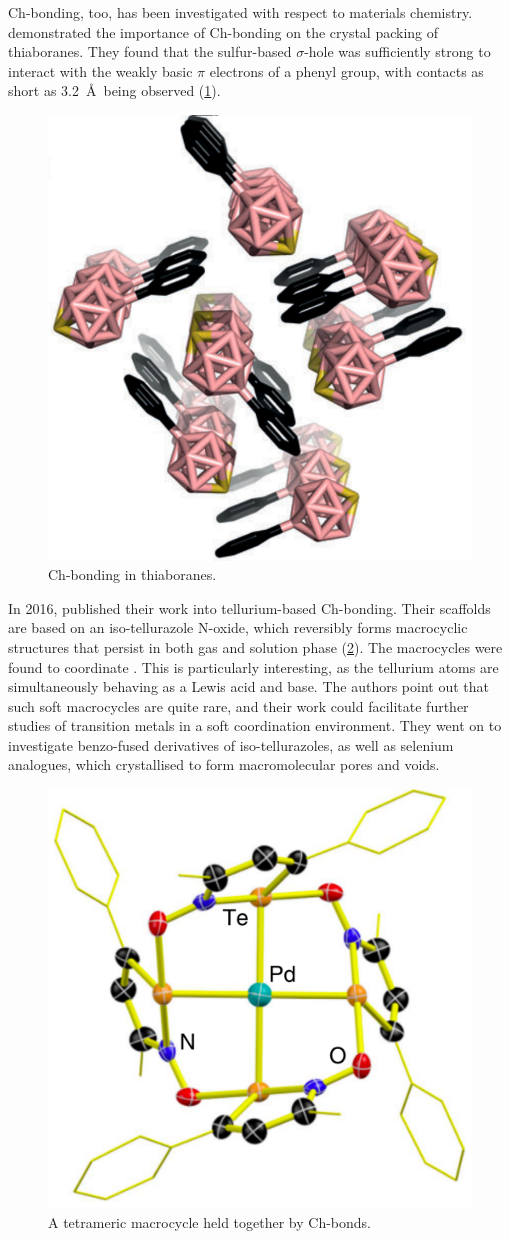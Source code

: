 \begin{refsection}
Ch-bonding, too, has been investigated with respect to materials chemistry.
\citeauthor{Fanfrlik2014} demonstrated the importance of Ch-bonding on the crystal packing of thiaboranes.\autocite{Fanfrlik2014}
They found that the sulfur-based $ \sigma $-hole was sufficiently strong to interact with the weakly basic $ \pi $ electrons of a phenyl group, with contacts as short as 3.2~\AA\ being observed (\cref{fig:thiaborane-ch-bond}).

\begin{figure}
    \centering
    \includegraphics[width=0.45\linewidth]{Figures/thiaborane-ch-bond.pdf}
    \caption[Ch-bonding in thiaboranes.]{Ch-bonding in thiaboranes.\autocite{Fanfrlik2014}}\label{fig:thiaborane-ch-bond}
\end{figure}

In 2016, \citeauthor{Ho2016} published their work into tellurium-based Ch-bonding.\autocite{Ho2016}
Their scaffolds are based on an iso-tellurazole N-oxide, which reversibly forms macrocyclic structures that persist in both gas and solution phase (\cref{fig:te-pd-macrocycle}).
The macrocycles were found to coordinate .
This is particularly interesting, as the tellurium atoms are simultaneously behaving as a Lewis acid and base.
The authors point out that such soft macrocycles are quite rare, and their work could facilitate further studies of transition metals in a soft coordination environment.
They went on to investigate benzo-fused derivatives of iso-tellurazoles, as well as selenium analogues, which crystallised to form macromolecular pores and voids.\autocite{Ho2017}

\begin{figure}
    \centering
    \includegraphics[width=0.4\linewidth]{Figures/te-pd-macrocycle.pdf}
    \caption[A tetrameric macrocycle held together by Ch-bonds.]{A tetrameric macrocycle held together by Ch-bonds.\autocite{Ho2016}}\label{fig:te-pd-macrocycle}
\end{figure}


\end{refsection}

